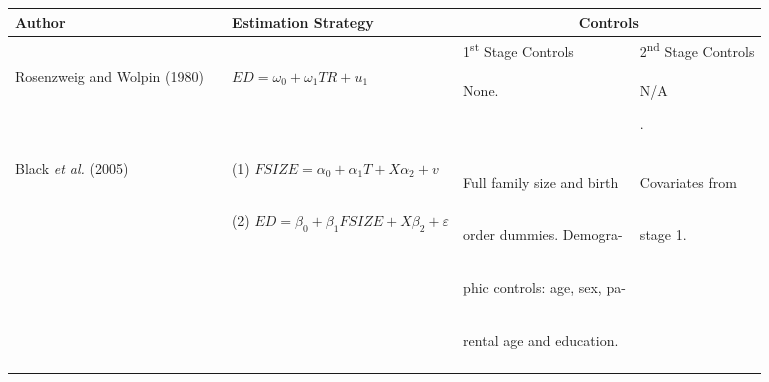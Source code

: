 \documentclass{article}[11pt,subeqn]
\begin{document}
\begin{spacing}{1.25}
\begin{center}
\begin{rotate}{90}
\begin{tabular}{lp{4mm}lll}\toprule
Author& &  Estimation Strategy & \multicolumn{2}{c}{Controls} \\ \midrule
&& & \hspace{5mm}1\textsuperscript{st} Stage Controls & 2\textsuperscript{nd} Stage Controls \\  \cmidrule(r){4-4} \cmidrule{5-5}
Rosenzweig and Wolpin (1980) & &
$ED=\omega_0+\omega_1 TR+u_1$&
\begin{small}None.\end{small}&
\begin{small}N\slash A\end{small}.
\\
\begin{footnotesize}\end{footnotesize}&\begin{footnotesize}\end{footnotesize}&\begin{footnotesize}\end{footnotesize}&\begin{footnotesize}\end{footnotesize}&\begin{footnotesize}\end{footnotesize}\\
\multirow{2}{*}{Black \emph{et al.} (2005)} & &
(1) $FSIZE=\alpha_0 + \alpha_1 T + X\alpha_2 + v$ &
\begin{small}Full family size and  birth \end{small}&
\begin{small}Covariates from\end{small}
\\
& &
(2) $ED=\beta_0+\beta_1 FSIZE + X\beta_2 + \varepsilon$ &
\begin{small}order dummies. Demogra-\end{small}  &
\begin{small}stage 1.\end{small}
\\
& & &
\begin{small}phic controls: age, sex, pa-\end{small}&
\\
& & &
\begin{small}rental age and education.\end{small}&
\\
\begin{footnotesize}\end{footnotesize}&\begin{footnotesize}\end{footnotesize}&\begin{footnotesize}\end{footnotesize}&\begin{footnotesize}\end{footnotesize}&\begin{footnotesize}\end{footnotesize}\\

\end{tabular}
\end{rotate}
\end{center}
\end{spacing}
\end{document}
